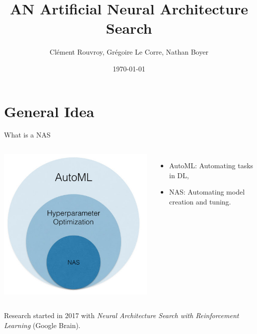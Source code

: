 \documentclass{beamer}
\date{\today}
\author{Clément Rouvroy, Grégoire Le Corre, Nathan Boyer}
\institute{Deep Learning Course - M1}
\title{\textcolor{mBlue}{AN} \textcolor{mBlue}{A}rtificial \textcolor{mBlue}{N}eural \textcolor{mBlue}{A}rchitecture \textcolor{mBlue}{S}earch}
\begin{document}
  \maketitle

\section{General Idea}
\begin{frame}{What is a NAS}
    \begin{columns}
        \centering
        \includegraphics[width=0.9\linewidth]{nas-inclusion.jpg}
        
        \centering
        \begin{itemize}
            \item[ ]\textcolor{mBlue}{AutoML}: Automating tasks in DL,
            \item[ ] \textcolor{mBlue}{NAS}: Automating model creation and tuning.
        \end{itemize}
        
    \end{columns}

Research started in 2017 with \emph{Neural Architecture Search with Reinforcement Learning} (Google Brain).
\end{frame}
\end{document}
